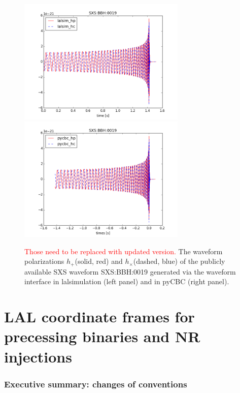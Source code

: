 \documentclass[11pt,tightenlines,article,amssymb,amsmath,amsfonts,superscriptaddress]{revtex4}
\newcommand{\red}{\textcolor{red}}
\begin{document}
\begin{figure}
\begin{center}
\includegraphics[width=80mm]{lalsim_TD_0019.png}
\includegraphics[width=80mm]{pycbc_TD_0019.png}
\caption{\red{Those need to be replaced with updated version.} The waveform polarizations $h_+$(solid, red) and $h_\times$(dashed, blue) of the publicly available SXS waveform SXS:BBH:0019 
generated via the waveform interface in lalsimulation (left panel) and in pyCBC (right panel).}
\label{fig:waveforms}
\end{center}
\end{figure}

\section{LAL coordinate frames for precessing binaries and NR injections}
\label{sec:coordinates}

\subsubsection{Executive summary: changes of conventions}
\end{document}
